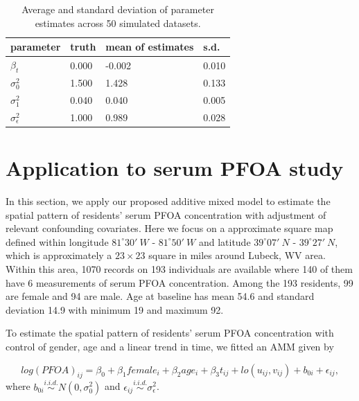	\begin{table}[H]
		\caption{Average and standard deviation of parameter estimates across 50 simulated datasets.\label{t:sim2paras}}
		\centering
		\begin{tabular}{llll}
			\hline
			parameter & truth & mean of estimates & s.d. \\ 
			\hline
			$\beta_t$ & 0.000 & -0.002 & 0.010 \\ 
			$\sigma_0^2$ & 1.500 & 1.428 & 0.133 \\ 
			$\sigma_1^2$ & 0.040 & 0.040 & 0.005 \\ 
			$\sigma_\epsilon^2$ & 1.000 & 0.989 & 0.028 \\ 
			\hline
		\end{tabular}
	\end{table}
	
	\section{Application to serum PFOA study}
	In this section, we apply our proposed additive mixed model to estimate the spatial pattern of residents' serum PFOA concentration with adjustment of relevant confounding covariates. Here we focus on a approximate square map defined within longitude  $81^{\circ} 30'\  W$ - $81^{\circ} 50'\  W$ and latitude $39^{\circ} 07'\  N$ - $39^{\circ} 27'\  N$, which is approximately a $23\times 23$ square in miles around Lubeck, WV area. Within this area, 1070 records on 193 individuals are available where 140 of them have 6 measurements of serum PFOA concentration. Among the 193 residents, 99 are female and 94 are male. Age at baseline has mean 54.6 and standard deviation 14.9 with minimum 19 and maximum 92.
	
	To estimate the spatial pattern of residents' serum PFOA concentration with control of gender, age and a linear trend in time, we fitted an AMM given by 
	
	\begin{equation}\label{mod:PFOA}
	log(PFOA)_{ij} = \beta_0 + \beta_1 female_i + \beta_2 age_i + \beta_3 t_{ij} + lo(u_{ij}, v_{ij}) +  b_{0i} + \epsilon_{ij}, 
	\end{equation}
	where $b_{0i} \stackrel{i.i.d.}{\sim} N(0,\sigma_0^2)$ and $\epsilon_{ij} \stackrel{i.i.d.}{\sim} \sigma_\epsilon^2$. 
	
